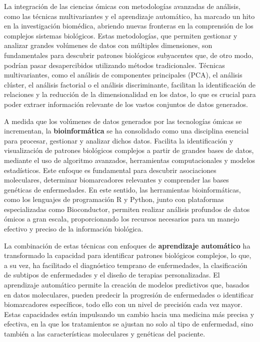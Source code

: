 La integración de las ciencias ómicas con metodologías avanzadas de análisis, como las técnicas multivariantes 
y el aprendizaje automático, ha marcado un hito en la investigación biomédica, abriendo nuevas fronteras en la 
comprensión de los complejos sistemas biológicos. Estas metodologías, que permiten gestionar y analizar grandes 
volúmenes de datos con múltiples dimensiones, son fundamentales para descubrir patrones biológicos subyacentes 
que, de otro modo, podrían pasar desapercibidos utilizando métodos tradicionales. Técnicas multivariantes, como 
el análisis de componentes principales (PCA), el análisis clúster, el análisis factorial o 
el análisis discriminante, facilitan la identificación de relaciones y la reducción de la dimensionalidad en los 
datos, lo que es crucial para poder extraer información relevante de los vastos conjuntos de datos generados. \newline

A medida que los volúmenes de datos generados por las tecnologías ómicas se incrementan, la \textbf{bioinformática} se ha 
consolidado como una disciplina esencial para procesar, gestionar y analizar dichos datos. Facilita la identificación y 
visualización de patrones biológicos complejos a partir de grandes bases de datos, mediante el uso de algoritmo avanzados,
herramientas computacionales y modelos estadísticos. Este enfoque es fundamental para descubrir asociaciones moleculares, 
determinar biomarcadores relevantes y comprender las bases genéticas de enfermedades. En este sentido, las herramientas
bioinformáticas, como los lenguajes de programación R y Python, junto con plataformas especializadas como Bioconductor, 
permiten realizar análisis profundos de datos ómicos a gran escala, proporcionando los recursos necesarios para un 
manejo efectivo y preciso de la información biológica. \newline

La combinación de estas técnicas con enfoques de \textbf{aprendizaje automático} ha transformado la capacidad 
para identificar patrones biológicos complejos, lo que, a su vez, ha facilitado el diagnóstico temprano de 
enfermedades, la clasificación de subtipos de enfermedades y el diseño de terapias personalizadas. El aprendizaje 
automático permite la creación de modelos predictivos que, basados en datos moleculares, pueden predecir la 
progresión de enfermedades o identificar biomarcadores específicos, todo ello con un nivel de precisión cada vez 
mayor. Estas capacidades están impulsando un cambio hacia una medicina más precisa y efectiva, en la que los 
tratamientos se ajustan no solo al tipo de enfermedad, sino también a las características moleculares y genéticas 
del paciente. \newline

